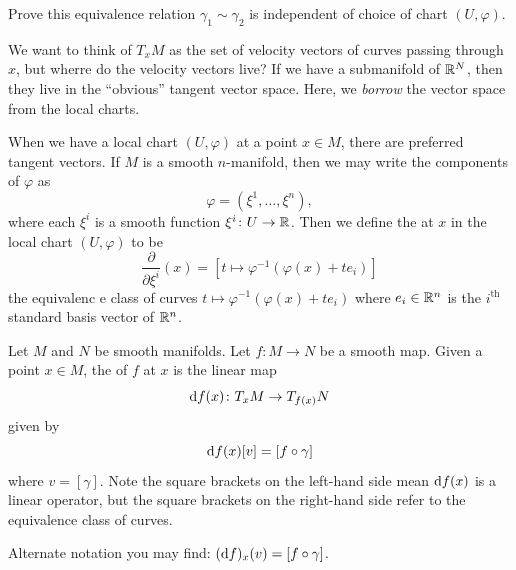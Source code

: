 \begin{xca}
Prove this equivalence relation $\gamma_{1}\sim\gamma_{2}$ is
independent of choice of chart $(U,\varphi)$.
\end{xca}

\begin{node}
We want to think of $T_{x}M$ as the set of velocity vectors of curves
passing through $x$, but wherre do the velocity vectors live? If we
have a submanifold of $\mathbb{R}^{N}$, then they live in the ``obvious''
tangent vector space. Here, we \emph{borrow} the vector space from the
local charts.
\end{node}

\begin{remark}
When we have a local chart $(U,\varphi)$ at a point $x\in M$, there
are preferred tangent vectors. If $M$ is a smooth $n$-manifold, then
we may write the components of $\varphi$ as
\begin{equation}
\varphi=(\xi^{1},\dots,\xi^{n}),
\end{equation}
where each $\xi^{i}$ is a smooth function $\xi^{i}\colon U\to\mathbb{R}$.
Then we define the 
at $x$ in the local chart $(U,\varphi)$ to be
\begin{equation}
\frac{\partial}{\partial\xi^{i}}(x)=[t\mapsto\varphi^{-1}(\varphi(x)+te_{i})]
\end{equation}
the equivalenc e class of curves $t\mapsto\varphi^{-1}(\varphi(x)+te_{i})$
where $e_{i}\in\mathbb{R}^{n}$ is the $i^{\text{th}}$ standard basis vector
of $\mathbb{R}^{n}$.
\end{remark}

\begin{definition}[Differential]
Let $M$ and $N$ be smooth manifolds. Let $f\colon M\to N$ be a smooth map.
Given a point $x\in M$, the  of $f$ at $x$ is the
linear map
\begin{equation}
\mathrm{d} f(x)\colon T_{x}M\to T_{f(x)}N
\end{equation}
given by
\begin{equation}
\mathrm{d} f(x)[v]=[f\circ\gamma]
\end{equation}
where $v=[\gamma]$. Note the square brackets on the left-hand side
mean $\mathrm{d} f(x)$ is a linear operator, but the square brackets on the
right-hand side refer to the equivalence class of curves.

Alternate notation you may find: $(\mathrm{d} f)_{x}(v)=[f\circ\gamma]$.
\end{definition}


